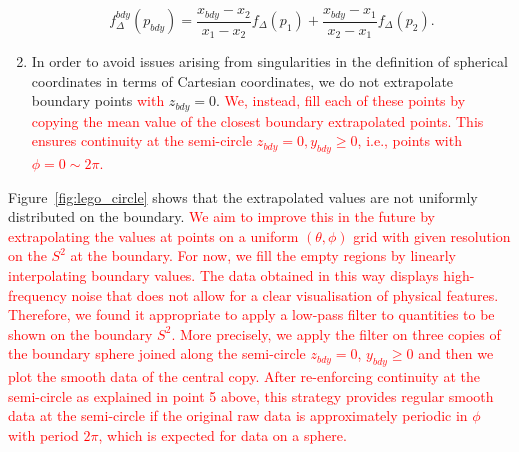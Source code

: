 \documentclass[a4paper,11pt]{article}
\numberwithin{equation}{section}
\begin{document}
\begin{enumerate}
 \begin{equation}
 \label{eq:firstordextrap}
 f^{bdy}_{\Delta}(p_{bdy})=\frac{x_{bdy}-x_2}{x_1-x_2}f_\Delta(p_1)+\frac{x_{bdy}-x_1}{x_2-x_1}f_\Delta(p_2).
 \end{equation}
 \item In order to avoid issues arising from singularities in the definition of spherical coordinates in terms of Cartesian coordinates, we do not extrapolate boundary points \textcolor{red}{with} $z_{bdy}=0$. 
\textcolor{red}{We, instead, fill each of these points by copying the mean value of the closest boundary extrapolated points. This ensures continuity at the semi-circle $z_{bdy}=0, y_{bdy}\geq 0$, i.e., points with $\phi=0\sim 2\pi$.}
 \end{enumerate}
 Figure~\ref{fig:lego_circle} shows that the extrapolated values are not uniformly distributed on the boundary. 
 \textcolor{red}{We aim to improve this in the future by extrapolating the values at points on a uniform $(\theta,\phi)$ grid with given resolution on the $S^2$ at the boundary. For now, we fill the empty regions by linearly interpolating boundary values. The data obtained in this way displays high-frequency noise that does not allow for a clear visualisation of physical features. Therefore, we found it appropriate to apply a low-pass filter to quantities to be shown on the boundary $S^2$. More precisely, we apply the filter on three copies of the boundary sphere joined along the semi-circle $z_{bdy}=0$, $y_{bdy}\geq 0$ and then we plot the smooth data of the central copy. After re-enforcing continuity at the semi-circle as explained in point 5 above, this strategy provides regular smooth data at the semi-circle if the original raw data is approximately periodic in $\phi$ with period $2\pi$, which is expected for data on a sphere.}
\end{document}
